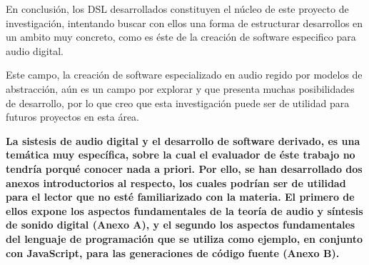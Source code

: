 En conclusión, los DSL desarrollados constituyen el núcleo de este proyecto de investigación, intentando buscar con ellos una forma de estructurar desarrollos en un ambito muy concreto, como es éste de la creación de software especifico para audio digital. 

Este campo, la creación de software especializado en audio regido por modelos de abstracción, aún es un campo por explorar y que presenta muchas posibilidades de desarrollo, por lo que creo que esta investigación puede ser de utilidad para futuros proyectos en esta área.

\begin{tcolorbox}[colback=gray!5,colframe=black,title=\textbf{Recomendación}]
\textbf{La sistesis de audio digital y el desarrollo de software derivado, es una temática muy específica, sobre la cual el evaluador de éste trabajo no tendría porqué conocer nada a priori. Por ello, se han desarrollado dos anexos introductorios al respecto, los cuales podrían ser de utilidad para el lector que no esté familiarizado con la materia. El primero de ellos expone los aspectos fundamentales de la teoría de audio y síntesis de sonido digital (Anexo A), y el segundo los aspectos fundamentales del lenguaje de programación que se utiliza como ejemplo, en conjunto con JavaScript, para las generaciones de código fuente (Anexo B).}
\end{tcolorbox}
